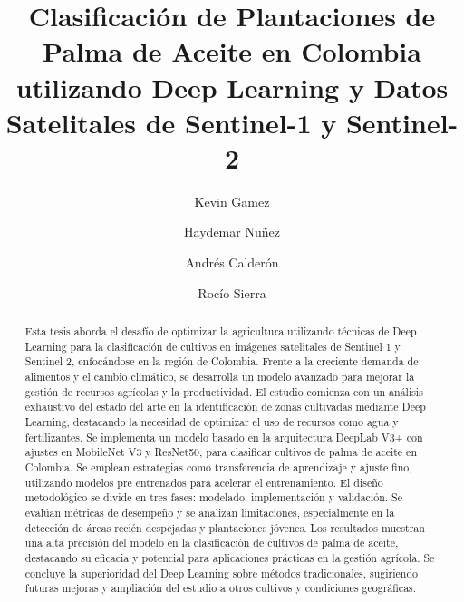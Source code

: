 \documentclass[USenglish,twocolumn]{article}
\begin{document}

\author*[1]{Kevin Gamez}
\author[2]{Haydemar Nuñez}
\author[3]{Andrés Calderón}
\author[4]{Rocío Sierra}


\title{Clasificación de Plantaciones de Palma de Aceite en Colombia utilizando Deep Learning y Datos Satelitales de Sentinel-1 y Sentinel-2}


\begin{abstract}{
    Esta tesis aborda el desafío de optimizar la agricultura utilizando técnicas de Deep Learning para la clasificación de cultivos en imágenes satelitales de Sentinel 1 y Sentinel 2, enfocándose en la región de Colombia. Frente a la creciente demanda de alimentos y el cambio climático, se desarrolla un modelo avanzado para mejorar la gestión de recursos agrícolas y la productividad. El estudio comienza con un análisis exhaustivo del estado del arte en la identificación de zonas cultivadas mediante Deep Learning, destacando la necesidad de optimizar el uso de recursos como agua y fertilizantes. Se implementa un modelo basado en la arquitectura DeepLab V3+ con ajustes en MobileNet V3 y ResNet50, para clasificar cultivos de palma de aceite en Colombia. Se emplean estrategias como transferencia de aprendizaje y ajuste fino, utilizando modelos pre entrenados para acelerar el entrenamiento. El diseño metodológico se divide en tres fases: modelado, implementación y validación. Se evalúan métricas de desempeño y se analizan limitaciones, especialmente en la detección de áreas recién despejadas y plantaciones jóvenes. Los resultados muestran una alta precisión del modelo en la clasificación de cultivos de palma de aceite, destacando su eficacia y potencial para aplicaciones prácticas en la gestión agrícola. Se concluye la superioridad del Deep Learning sobre métodos tradicionales, sugiriendo futuras mejoras y ampliación del estudio a otros cultivos y condiciones geográficas.
}
\end{abstract}




\maketitle










\end{document}

